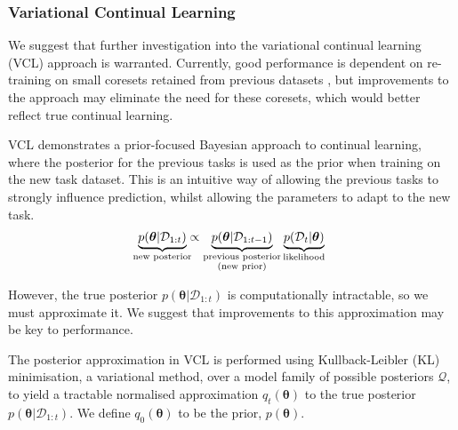 \documentclass[a4paper,11=0pt]{article}
\let\boldtheta\theta %
\renewcommand{\theta}{\boldsymbol{\boldtheta}} %
\begin{document}
\vspace{-1em}
\subsubsection*{Variational Continual Learning}

\vspace{-1em}
We suggest that further investigation into the variational continual learning (VCL) approach \cite{vcl} is warranted. Currently, good performance is dependent on re-training on small coresets retained from previous datasets \cite{robust}, but improvements to the approach may eliminate the need for these coresets, which would better reflect true continual learning. %

VCL demonstrates a prior-focused Bayesian approach to continual learning, where the posterior for the previous tasks is used as the prior when training on the new task dataset. This is an intuitive way of allowing the previous tasks to strongly influence prediction, whilst allowing the parameters to adapt to the new task. %
\begin{equation}\label{eq:1}
\begin{split}
\underbrace{p(\theta | \mathcal{D}_{1:t})}_{\mathclap{\text{new posterior}}} \propto \underbrace{p(\theta | \mathcal{D}_{1:t-1})}_{\substack{\text{previous posterior}\\ (\text{new prior})}} \underbrace{p(\mathcal{D}_t | \theta)}_{\text{likelihood}}
\end{split}
\end{equation}

\vspace{-0.75em}
However, the true posterior $p(\theta | \mathcal{D}_{1:t})$ is computationally intractable, so we must approximate it. We suggest that improvements to this approximation may be key to performance. %

The posterior approximation in VCL is performed using Kullback-Leibler (KL) minimisation, a variational method, over a model family of possible posteriors $\mathcal{Q}$, to yield a tractable normalised approximation $q_t(\theta)$ to the true posterior $p(\theta | \mathcal{D}_{1:t})$. We define $q_0(\theta)$ to be the prior, $p(\theta)$.
\end{document}
